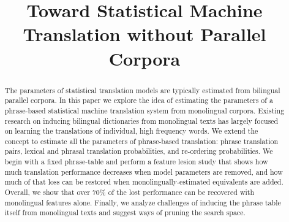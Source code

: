 \documentclass[11pt]{article}
\title{Toward Statistical Machine Translation without Parallel Corpora}
\author{}
\date{}
\begin{document}
\maketitle
\begin{abstract}
The parameters of statistical translation models are typically estimated from bilingual parallel corpora.   In this paper we explore the idea of estimating the parameters of a phrase-based statistical machine translation system from monolingual corpora.  Existing research on inducing bilingual dictionaries from monolingual texts has largely focused on learning the translations of individual, high frequency words.   We extend the concept to estimate all the parameters of phrase-based translation: phrase translation pairs, lexical and phrasal translation probabilities, and re-ordering probabilities.  We begin with a fixed phrase-table and perform a feature lesion study that shows how much translation performance decreases when model parameters are removed, and how much of that loss can be restored when monolingually-estimated equivalents are added.  Overall, we show that over 70\% of the lost performance can be recovered with monolingual features alone.  Finally, we analyze challenges of inducing the phrase table itself from monolingual texts and suggest ways of pruning the search space.  



\end{abstract}
\end{document}
